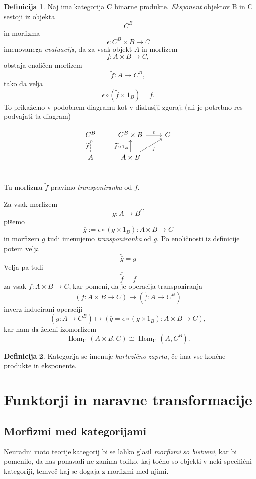 \documentclass[12pt,a4paper]{book}
\theoremstyle{definition}
\newtheorem{definicija}{Definicija}[chapter]
\theoremstyle{plain}
\theoremstyle{definition}
\theoremstyle{remark}
\newcommand{\cat}[1]{\textbf{#1}}
\DeclareMathOperator{\Hom}{Hom}
\begin{document}
\begin{definicija}
Naj ima kategorija $\cat{C}$ binarne produkte. \emph{Eksponent} objektov B in C sestoji iz objekta 
$$C^B$$
in morfizma
$$\epsilon : C^B \times B \to C$$ imenovanega \emph{evaluacija}, da za vsak objekt $A$ in morfizem 
$$f : A \times B \to C,$$
obstaja enoličen morfizem 
$$\widetilde{f} : A \to C^B,$$
tako da velja
$$\epsilon \circ (\widetilde{f} \times 1_B) = f.$$
To prikažemo v podobnem diagramu kot v diskusiji zgoraj: (ali je potrebno res podvajati ta diagram)

$$\begin{tikzcd}
C^B &  C^B \times B \ar[r, "\epsilon"] & C \\
A \ar[u, dashed, "\widetilde{f}"] &  A \times B \ar[u, "\widetilde{f} \times 1_B"] \ar[ur, "f"'] & \\
\end{tikzcd}$$

Tu morfizmu $\widetilde{f}$ pravimo \emph{transponiranka} od $f$.
\end{definicija}

Za vsak morfizem $$g : A \to B^C$$ pišemo
$$ \overline{g} := \epsilon \circ (g \times 1_B) : A \times B \to C$$
in morfizem $\overline{g}$ tudi imenujemo \textit{transponiranka} od $g$. Po enoličnosti iz definicije potem velja
$$\widetilde{\overline{g}} = g$$
Velja pa tudi
$$\overline{\widetilde{f}} = f$$
za vsak $f : A \times B \to C$, kar pomeni, da je operacija transponiranja
$$(f : A \times B \to C) \mapsto (\widetilde{f} : A \to C^B)$$
inverz inducirani operaciji
$$(g : A \to C^B) \mapsto (\overline{g} = \epsilon \circ (g \times 1_B) : A \times B \to C),$$
kar nam da želeni izomorfizem
$$\Hom_{\cat{C}}(A \times B, C) \cong \Hom_{\cat{C}}(A, C^B).$$

\begin{definicija}
Kategorija se imenuje \emph{kartezično zaprta}, če ima vse končne produkte in eksponente.
\end{definicija}

\section{Funktorji in naravne transformacije}

\subsection{Morfizmi med kategorijami}

Neuradni moto teorije kategorij bi se lahko glasil \emph{morfizmi so bistveni},
kar bi pomenilo, da nas ponavadi ne zanima toliko, kaj točno so objekti v neki specifični kategoriji, temveč kaj se dogaja z morfizmi med njimi.
\end{document}
